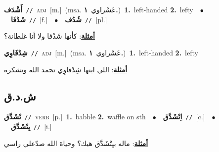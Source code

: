\documentclass[10pt,a4paper,twoside]{article} %
\begin{document}
\begin{multicols}{2}
{\setlength\topsep{0pt}\textbf{\foreignlanguage{arabic}{أَشْدَف}}\ {\color{gray}\texttt{//}\color{black}}\ \textsc{adj}\ [m.]\ \color{gray}(msa. \foreignlanguage{arabic}{عَسْراوي}~\foreignlanguage{arabic}{\textbf{١.}})\color{black}\ \textbf{1.}~left-handed  \textbf{2.}~lefty\ \ $\bullet$\ \ \setlength\topsep{0pt}\textbf{\foreignlanguage{arabic}{شَدْفَا}}\ {\color{gray}\texttt{//}\color{black}}\ [f.]\ \ $\bullet$\ \ \setlength\topsep{0pt}\textbf{\foreignlanguage{arabic}{شُدُف}}\ {\color{gray}\texttt{//}\color{black}}\ [pl.]\  \begin{flushright}\color{gray}\foreignlanguage{arabic}{\textbf{\underline{\foreignlanguage{arabic}{أمثلة}}}: كأنها شَدْفا ولا أنا غلطانة؟}\end{flushright}\color{black}} \vspace{2mm}

{\setlength\topsep{0pt}\textbf{\foreignlanguage{arabic}{شِدْفَاوِي}}\ {\color{gray}\texttt{//}\color{black}}\ \textsc{adj}\ [m.]\ \color{gray}(msa. \foreignlanguage{arabic}{عَسْراوي}~\foreignlanguage{arabic}{\textbf{١.}})\color{black}\ \textbf{1.}~left-handed  \textbf{2.}~lefty\  \begin{flushright}\color{gray}\foreignlanguage{arabic}{\textbf{\underline{\foreignlanguage{arabic}{أمثلة}}}: اللي ابنها شِدْفاوِي تحمد الله وتشكره}\end{flushright}\color{black}} \vspace{2mm}

\vspace{-3mm}
\subsection*{\color{blue}\foreignlanguage{arabic}{ش.د.ق}\color{blue}{}} 

{\setlength\topsep{0pt}\textbf{\foreignlanguage{arabic}{تْشَدَّق}}\ {\color{gray}\texttt{//}\color{black}}\ \textsc{verb}\ [p.]\ \textbf{1.}~babble  \textbf{2.}~waffle on sth\ \ $\bullet$\ \ \setlength\topsep{0pt}\textbf{\foreignlanguage{arabic}{اِتْشَدَّق}}\ {\color{gray}\texttt{//}\color{black}}\ [c.]\ \ $\bullet$\ \ \setlength\topsep{0pt}\textbf{\foreignlanguage{arabic}{يِتْشَدَّق}}\ {\color{gray}\texttt{//}\color{black}}\ [i.]\  \begin{flushright}\color{gray}\foreignlanguage{arabic}{\textbf{\underline{\foreignlanguage{arabic}{أمثلة}}}: ماله بيِتْشَدَّق هيك؟ وحياة الله صدّعلي راسي}\end{flushright}\color{black}} \vspace{2mm}


\end{multicols}
\end{document}

